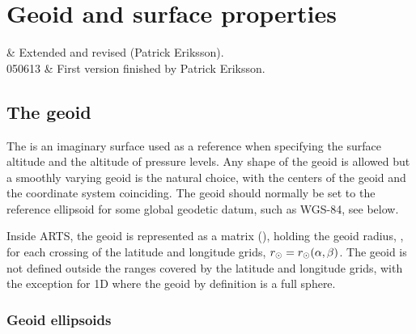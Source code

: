 \chapter{Geoid and surface properties}
 \label{sec:surface}


 & Extended and revised (Patrick Eriksson). \\
  050613 & First version finished by Patrick Eriksson. \\
\stophistory


\graphicspath{{Figs/ppath/}}


\section{The geoid}
\label{sec:fm_defs:geoid}

The  is an imaginary surface used as a
reference when specifying the surface altitude and the altitude
of pressure levels. Any shape of the geoid is allowed but a smoothly
varying geoid is the natural choice, with the centers of the geoid and
the coordinate system coinciding. The geoid should normally be set to
the reference ellipsoid for some global geodetic datum, such as
WGS-84, see below.

Inside ARTS, the geoid is represented as a matrix (),
holding the geoid radius, \aRds{\odot}, for each crossing of the latitude and
longitude grids, $r_{\odot}=r_{\odot}(\alpha,\beta)$. The geoid is not
defined outside the ranges covered by the latitude and longitude grids, with
the exception for 1D where the geoid by definition is a full sphere. 




\subsection{Geoid ellipsoids}
\label{sec:ppath:geoid}


